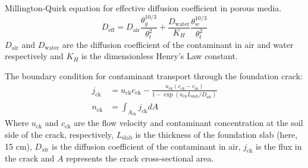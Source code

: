 \documentclass[journal=esthag,manuscript=suppinfo]{achemso}
\begin{document}
Millington-Quirk equation for effective diffusion coefficient in porous media\cite{Millington1961a}.
\begin{equation}
  D_\mathrm{eff} = D_\mathrm{air}\frac{\theta_g^{10/3}}{\theta_t^2} + \frac{D_\mathrm{water}}{K_H} \frac{\theta_w^{10/3}}{\theta_t^2} \label{eq:millington-quirk}
\end{equation}
$D_\mathrm{air}$ and $D_\mathrm{water}$ are the diffusion coefficient of the contaminant in air and water respectively and $K_H$ is the dimensionless Henry’s Law constant. \par

The boundary condition for contaminant transport through the foundation crack:
\begin{align}
  j_\mathrm{ck} &= u_\mathrm{ck} c_\mathrm{ck} - \frac{u_\mathrm{ck} (c_\mathrm{ck} - c_\mathrm{in})}{1 - \exp{(u_\mathrm{ck}L_\mathrm{slab}/D_\mathrm{air})}} \label{eq:j_ck} \\
  n_\mathrm{ck} &= \int_{A_\mathrm{ck}} j_\mathrm{ck} dA \label{eq:n_ck}
\end{align}
Where $u_\mathrm{ck}$ and $c_\mathrm{ck}$ are the flow velocity and contaminant concentration at the soil side of the crack, respectively, $L_\mathrm{slab}$ is the thickness of the foundation slab (here, 15 cm), $D_\mathrm{air}$ is the diffusion coefficient of the contaminant in air, $j_\mathrm{ck}$ is the flux in the crack and $A$ represents the crack cross-sectional area.
\end{document}
